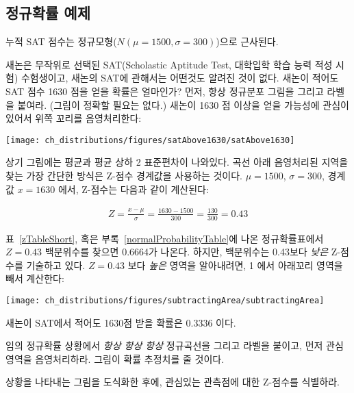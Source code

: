 \subsection{정규확률 예제}

누적 SAT 점수는 정규모형($N(\mu=1500, \sigma=300)$)으로 근사된다.

\begin{example}{새논은 무작위로 선택된 SAT(Scholastic Aptitude Test, 대학입학 학습 능력 적성 시험) 수험생이고, 새논의 SAT에 관해서는 어떤것도 알려진 것이 없다. 새논이 적어도 SAT 점수 1630 점을 얻을 확률은 얼마인가?}\label{satAbove1630Exam}
먼저, 항상 정규분포 그림을 그리고 라벨을 붙여라. (그림이 정확할 필요는 없다.) 새논이 1630 점 이상을 얻을 가능성에 관심이 있어서 위쪽 꼬리를 음영처리한다:
\begin{center}
\texttt{[image: ch\_distributions/figures/satAbove1630/satAbove1630]}
\end{center}
상기 그림에는 평균과 평균 상하 2 표준편차이 나와있다. 곡선 아래 음영처리된 지역을 찾는 가장 간단한 방식은 Z-점수 경계값을 사용하는 것이다. $\mu=1500$, $\sigma=300$, 경계값 $x=1630$ 에서, Z-점수는 다음과 같이 계산된다:

\begin{eqnarray*}
Z = \frac{x - \mu}{\sigma} = \frac{1630 - 1500}{300} = \frac{130}{300} = 0.43
\end{eqnarray*}

표~\ref{zTableShort}, 혹은 부록~\vref{normalProbabilityTable}에 나온 정규확률표에서 $Z=0.43$ 백분위수를 찾으면 0.6664가 나온다. 하지만, 백분위수는 0.43보다 \emph{낮은} Z-점수를 기술하고 있다. $Z=0.43$ 보다 \emph{높은} 영역을 알아내려면, 1 에서 아래꼬리 영역을 빼서 계산한다:

\begin{center}
\texttt{[image: ch\_distributions/figures/subtractingArea/subtractingArea]}
\end{center}
새논이 SAT에서 적어도 1630점 받을 확률은 0.3336 이다.
\end{example}

\begin{tipBox}{
임의 정규확률 상황에서 \emph{항상 항상 항상} 정규곡선을 그리고 라벨을 붙이고, 먼저 관심 영역을 음영처리하라. 그림이 확률 추정치를 줄 것이다. \vspace{3mm}

상황을 나타내는 그림을 도식화한 후에, 관심있는 관측점에 대한 Z-점수를 식별하라.\vspace{1mm}}
\end{tipBox}


